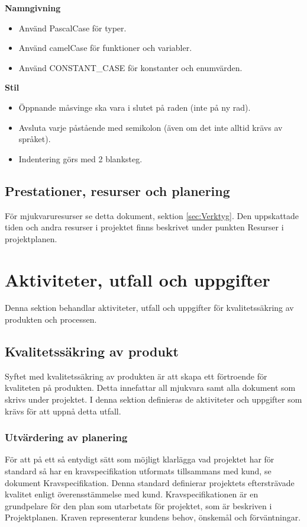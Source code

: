 \documentclass[a4paper,10pt]{article}
\begin{document}
\textbf{Namngivning}
\begin{itemize}
\item Använd PascalCase för typer.
\item Använd camelCase för funktioner och variabler.
\item Använd CONSTANT\_CASE för konstanter och enumvärden.
\end{itemize}

\textbf{Stil}
\begin{itemize}
\item Öppnande måsvinge ska vara i slutet på raden (inte på ny rad).
\item Avsluta varje påstående med semikolon (även om det inte alltid krävs av språket).
\item Indentering görs med 2 blanksteg.
\end{itemize}

\subsection{Prestationer, resurser och planering}
För mjukvaruresurser se detta dokument, sektion \ref{sec:Verktyg}.
Den uppskattade tiden och andra resurser i projektet finns beskrivet under punkten Resurser i projektplanen.

\section{Aktiviteter, utfall och uppgifter}
Denna sektion behandlar aktiviteter, utfall och uppgifter för kvalitetssäkring av produkten och processen.
\subsection{Kvalitetssäkring av produkt}
Syftet med kvalitetssäkring av produkten är att skapa ett förtroende för kvaliteten på produkten. Detta innefattar all mjukvara samt alla dokument som skrivs under projektet. I denna sektion definieras de aktiviteter och uppgifter som krävs för att uppnå detta utfall.
\subsubsection{Utvärdering av planering}
För att på ett så entydigt sätt som möjligt klarlägga vad projektet har för standard så har en kravspecifikation utformats tillsammans med kund, se dokument Kravspecifikation.
Denna standard definierar projektets eftersträvade kvalitet enligt överensstämmelse med kund.
Kravspecifikationen är en grundpelare för den plan som utarbetats för projektet, som är beskriven i Projektplanen. Kraven representerar kundens behov, önskemål och förväntningar.
\end{document}
